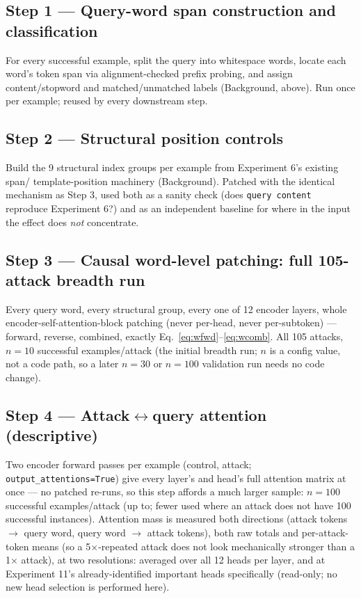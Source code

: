 \documentclass[11pt]{article}
\begin{document}
\subsection{Step 1 --- Query-word span construction and classification}
For every successful example, split the query into whitespace words, locate each word's
token span via alignment-checked prefix probing, and assign content/stopword and
matched/unmatched labels (Background, above). Run once per example; reused by every
downstream step.

\subsection{Step 2 --- Structural position controls}
Build the 9 structural index groups per example from Experiment 6's existing span/
template-position machinery (Background). Patched with the identical mechanism as Step 3,
used both as a sanity check (does \texttt{query content} reproduce Experiment 6?) and as
an independent baseline for where in the input the effect does \emph{not} concentrate.

\subsection{Step 3 --- Causal word-level patching: full 105-attack breadth run}
Every query word, every structural group, every one of 12 encoder layers, whole
encoder-self-attention-block patching (never per-head, never per-subtoken) — forward,
reverse, combined, exactly Eq.~\ref{eq:wfwd}--\ref{eq:wcomb}. All 105 attacks,
$n{=}10$ successful examples/attack (the initial breadth run; $n$ is a config value, not
a code path, so a later $n{=}30$ or $n{=}100$ validation run needs no code change).

\subsection{Step 4 --- Attack$\leftrightarrow$query attention (descriptive)}
Two encoder forward passes per example (control, attack; \texttt{output\_attentions=True})
give every layer's and head's full attention matrix at once — no patched re-runs, so this
step affords a much larger sample: $n{=}100$ successful examples/attack (up to; fewer used
where an attack does not have 100 successful instances). Attention mass is measured both
directions (attack tokens $\to$ query word, query word $\to$ attack tokens), both raw
totals and per-attack-token means (so a 5$\times$-repeated attack does not look
mechanically stronger than a 1$\times$ attack), at two resolutions: averaged over all 12
heads per layer, and at Experiment 11's already-identified important heads specifically
(read-only; no new head selection is performed here).
\end{document}

